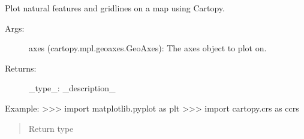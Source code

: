 \documentclass[letterpaper,10pt,english]{sphinxmanual}
\begin{document}
\begin{fulllineitems}
\label{\detokenize{_autosummary/planetscope.coast.plot_coast:planetscope.coast.plot_coast}}
\sphinxAtStartPar
Plot natural features and gridlines on a map using Cartopy.
\begin{description}
\item[{Args:}] \leavevmode
\sphinxAtStartPar
axes (cartopy.mpl.geoaxes.GeoAxes): The axes object to plot on.

\item[{Returns:}] \leavevmode
\sphinxAtStartPar
\_type\_: \_description\_

\end{description}

\sphinxAtStartPar
Example:
\textgreater{}\textgreater{}\textgreater{} import matplotlib.pyplot as plt
\textgreater{}\textgreater{}\textgreater{} import cartopy.crs as ccrs

\begin{sphinxVerbatim}[commandchars=\\\{\}]
      
\end{sphinxVerbatim}

\begin{sphinxVerbatim}[commandchars=\\\{\}]
  
\end{sphinxVerbatim}

\begin{sphinxVerbatim}[commandchars=\\\{\}]
\end{sphinxVerbatim}

\begin{sphinxVerbatim}[commandchars=\\\{\}]
\end{sphinxVerbatim}
\begin{quote}\begin{description}
\item[{Return type}] \leavevmode
\sphinxAtStartPar
{}


\end{description}
\end{quote}
\end{fulllineitems}
\end{document}
